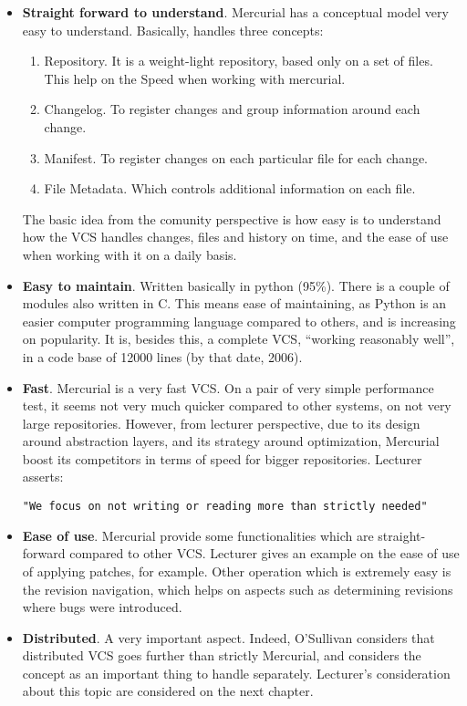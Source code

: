 \documentclass[11pt]{article}
\begin{document}
\begin{itemize}
\item{\textbf{Straight forward to understand}}. Mercurial has a conceptual model very easy to understand. Basically, handles three concepts:
\begin{enumerate}\itemsep0pt
\item{Repository}. It is a weight-light repository, based only on a set of files. This help on the Speed when working with mercurial.
\item{Changelog}. To register changes and group information around each change.
\item{Manifest}. To register changes on each particular file for each change.
\item{File Metadata}. Which controls additional information on each file.
\end{enumerate}
The basic idea from the comunity perspective is how easy is to understand how the VCS handles changes, files and history on time, and the ease of use when working with it on a daily basis.
\item{\textbf{Easy to maintain}}. Written basically in python (95\%). There is a couple of modules also written in C. This means ease of maintaining, as Python is an easier computer programming language compared to others, and is increasing on popularity. It is, besides this, a complete VCS, ``working reasonably well'', in a code base of 12000 lines (by that date, 2006).
\item{\textbf{Fast}}. Mercurial is a very fast VCS. On a pair of very simple performance test, it seems not very much quicker compared to other systems, on not very large repositories. However, from lecturer perspective, due to its design around abstraction layers, and its strategy around optimization, Mercurial boost its competitors in terms of speed for bigger repositories. Lecturer asserts:
\begin{verbatim}
"We focus on not writing or reading more than strictly needed"
\end{verbatim}
\item{\textbf{Ease of use}}. Mercurial provide some functionalities which are straight-forward compared to other VCS. Lecturer gives an example on the ease of use of applying patches, for example. Other operation which is extremely easy is the revision navigation, which helps on aspects such as determining revisions where bugs were introduced.
\item{\textbf{Distributed}}. A very important aspect. Indeed, O'Sullivan considers that distributed VCS goes further than strictly Mercurial, and considers the concept as an important thing to handle separately. Lecturer's consideration about this topic are considered on the next chapter.
\end{itemize}
\end{document}
